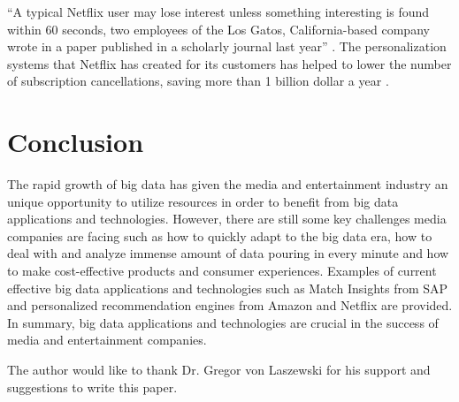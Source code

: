 ``A typical Netflix user may lose interest unless something interesting is found within 60 seconds, two employees of the Los Gatos, California-based company wrote in a paper published in a scholarly journal last year''  \cite{Whitley2016data}. The personalization systems that Netflix has created for its customers has helped to lower the number of subscription cancellations, saving more than 1 billion dollar a year \cite{Whitley2016data}.

\section{Conclusion}

The rapid growth of big data has given the media and entertainment industry an unique opportunity to utilize resources in order to benefit from big data applications and technologies. However, there are still some key challenges media companies are facing such as how to quickly adapt to the big data era, how to deal with and analyze immense amount of data pouring in every minute and how to make cost-effective products and consumer experiences. Examples of current effective big data applications and technologies such as Match Insights from SAP and personalized recommendation engines from Amazon and Netflix are provided. In summary, big data applications and technologies are crucial in the success of media and entertainment companies.

\begin{acks}

  The author would like to thank Dr. Gregor von Laszewski for his support and suggestions to write this paper.

\end{acks}


 
